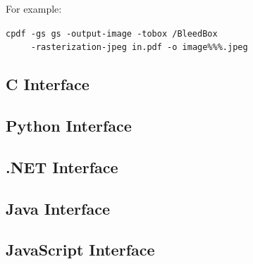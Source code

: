 \documentclass{book}
\begin{document}
\noindent For example:

  \begin{framed}
  \noindent\small\verb!cpdf -gs gs -output-image -tobox /BleedBox!\\
  \noindent\small\verb!     -rasterization-jpeg in.pdf -o image%%%.jpeg!
  \end{framed}


\begin{cpdflib}
\clearpage
\section*{C Interface}
\begin{small}\tt

\end{small}
\end{cpdflib}

\begin{pycpdflib}
\clearpage
\section*{Python Interface}
\begin{small}\tt

\end{small}
\end{pycpdflib}
\pagestyle{fancy}

\begin{dotnetcpdflib}
\clearpage
\section*{.NET Interface}
\begin{small}\tt

\end{small}
\end{dotnetcpdflib}

\begin{jcpdflib}
\clearpage
\section*{Java Interface}
\begin{small}\tt

\end{small}
\end{jcpdflib}

\begin{jscpdflib}
\clearpage
\section*{JavaScript Interface}
\begin{small}\tt

\end{small}
\end{jscpdflib}
\end{document}
